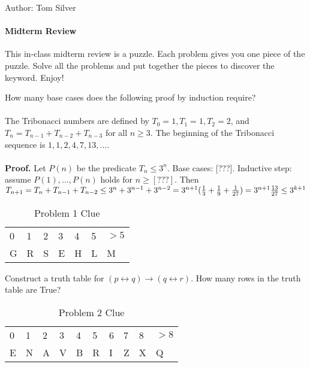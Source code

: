 \documentclass[solution, letterpaper]{cs20inclass}
\begin{document}

\noindent Author: Tom Silver%

\paragraph*{Midterm Review}
This in-class midterm review is a puzzle. Each problem gives you one piece of the puzzle. Solve all the problems and put together the pieces to discover the keyword. Enjoy!

\problem How many base cases does the following proof by induction require?
\\
\\ The Tribonacci numbers are defined by $T_0 = 1, T_1 = 1, T_2 = 2$, and $T_n = T_{n-1} + T_{n-2} + T_{n-3}$ for all $n \ge 3$. The beginning of the Tribonacci sequence is $1, 1, 2, 4, 7, 13, ...$. 
\\
\\ \textbf{Proof.} Let $P(n)$ be the predicate $T_n \le 3^n$. Base cases: [???]. Inductive step: assume $P(1), ..., P(n)$ holds for $n \ge [???]$. Then 
\begin{math}
T_{n+1} = T_n + T_{n-1} + T_{n-2}
\\ \le 3^n + 3^{n-1} + 3^{n-2}
\\ = 3^{n+1}(\frac{1}{3} + \frac{1}{9} + \frac{1}{27})
\\ = 3^{n+1}\frac{13}{27}
\\ \le 3^{k+1}
\end{math} 


\begin{table}[h]
\centering
\begin{tabular}{lllllll}
0 & 1 & 2 & 3 & 4 & 5 & $>5$ \\
G & R & S & E & H & L & M
\end{tabular}
\caption*{Problem 1 Clue}
\end{table}

\begin{solution}
\end{solution}

\problem Construct a truth table for $(p \leftrightarrow q) \to (q \leftrightarrow r)$. How many rows in the truth table are True?

\begin{table}[h]
\centering
\begin{tabular}{llllllllll}
0 & 1 & 2 & 3 & 4 & 5 & 6 & 7 & 8 & $>8$ \\
E & N & A & V & B & R & I & Z & X & Q            
\end{tabular}
\caption*{Problem 2 Clue}
\end{table}
\end{document}

